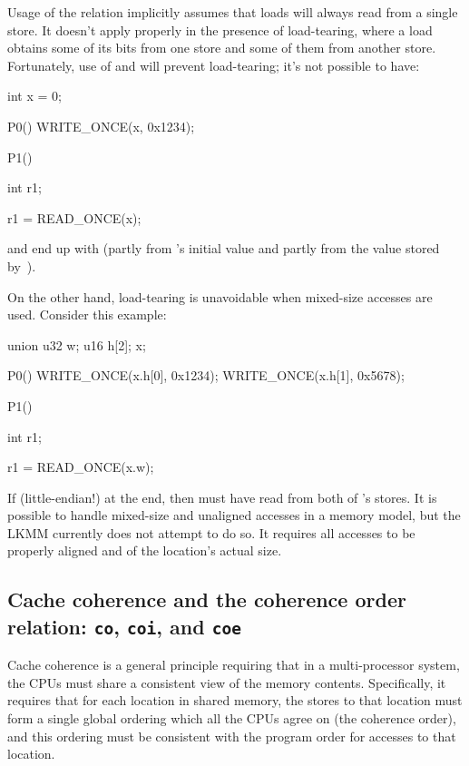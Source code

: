 Usage of the  relation implicitly assumes that loads will always
read from a single store.
It doesn't apply properly in the presence of load-tearing, where a
load obtains some of its bits from one store and some of them from
another store.
Fortunately, use of  and  will
prevent load-tearing; it's not possible to have:

\begin{VerbatimU}
	int x = 0;

	P0()
	{
		WRITE_ONCE(x, 0x1234);
	}

	P1()
	{
		int r1;

		r1 = READ_ONCE(x);
	}
\end{VerbatimU}

\noindent%
and end up with  (partly from 's initial value
and partly from the value stored by~).

On the other hand, load-tearing is unavoidable when mixed-size
accesses are used.
Consider this example:

\begin{VerbatimU}
	union {
		u32	w;
		u16	h[2];
	} x;

	P0()
	{
		WRITE_ONCE(x.h[0], 0x1234);
		WRITE_ONCE(x.h[1], 0x5678);
	}

	P1()
	{
		int r1;

		r1 = READ_ONCE(x.w);
	}
\end{VerbatimU}

If  (little-endian{!}) at the end, then 
must have read from both of 's stores.
It is possible to handle mixed-size and unaligned accesses in a memory
model, but the LKMM currently does not attempt to do so.
It requires all accesses to be properly aligned and of the location's
actual size.


\subsection{Cache coherence and the coherence order relation: \texttt{co}, \texttt{coi}, and \texttt{coe}}
\label{sec:docs:explanation:Cache Coherence and The Coherence Order Relation}

Cache coherence is a general principle requiring that in a
multi-processor system, the CPUs must share a consistent view of the
memory contents.
Specifically, it requires that for each location in shared memory,
the stores to that location must form a single global ordering which
all the CPUs agree on (the coherence order), and this ordering must be
consistent with the program order for accesses to that location.

